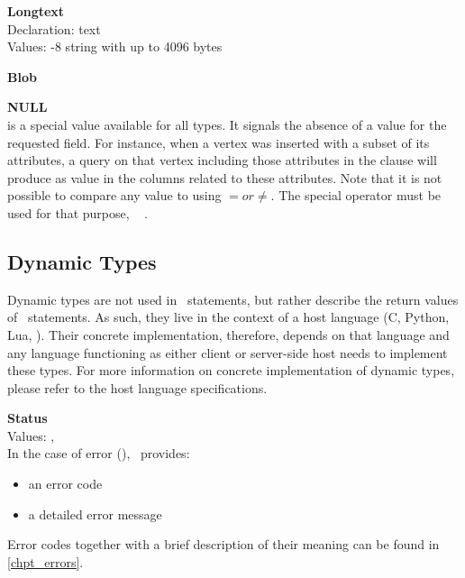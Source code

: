 \begin{minipage}{\textwidth}
\textbf{Longtext} \\
Declaration: text \\
Values: -8 string with up to 4096 bytes\\
\end{minipage}

\begin{minipage}{\textwidth}
\textbf{Blob} \\
\end{minipage}

\begin{minipage}{\textwidth}
\textbf{NULL} \\
 is a special value available for all types.
It signals the absence of a value for the requested field.
For instance, when a vertex was inserted with a subset
of its attributes, a query on that vertex including
those attributes in the  clause
will produce  as value in the
columns related to these attributes.
Note that it is not possible to compare any value to 
using $= or \neq$. The special operator  must
be used for that purpose, \eg\
  .
\end{minipage}

\subsection{Dynamic Types}
Dynamic types are not used in \sql\ statements,
but rather describe the return values of \sql\
statements. As such, they live in the context
of a host language (C, Python, Lua, \etc).
Their concrete implementation, therefore,
depends on that language and any language
functioning as either client or server-side host
needs to implement these types.
For more information on concrete implementation
of dynamic types, please refer to the
host language \acronym{api} specifications.

\begin{minipage}{\textwidth}
\textbf{Status}\\
Values: , \\
In the case of error (), \nowdb\ provides:
\begin{itemize}
\item an error code
\item a detailed error message
\end{itemize}
Error codes together with a brief description
of their meaning can be found in \ref{chpt_errors}.
\end{minipage}

